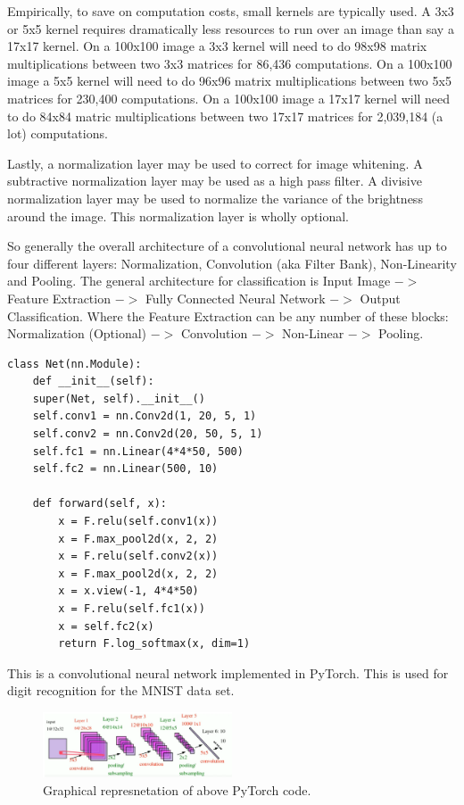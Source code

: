Empirically, to save on computation costs, small kernels are typically used.
A 3x3 or 5x5 kernel requires dramatically less resources to run over an image than say a 17x17 kernel.
On a 100x100 image a 3x3 kernel will need to do 98x98 matrix multiplications between two 3x3 matrices for 86,436 computations.
On a 100x100 image a 5x5 kernel will need to do 96x96 matrix multiplications between two 5x5 matrices for 230,400 computations.
On a 100x100 image a 17x17 kernel will need to do 84x84 matric multiplications between two 17x17 matrices for 2,039,184 (a lot) computations.

Lastly, a normalization layer may be used to correct for image whitening.
A subtractive normalization layer may be used as a high pass filter.
A divisive normalization layer may be used to normalize the variance of the brightness around the image.
This normalization layer is wholly optional.

So generally the overall architecture of a convolutional neural network has up to four different layers: Normalization, Convolution (aka Filter Bank), Non-Linearity and Pooling.
The general architecture for classification is Input Image $->$ Feature Extraction $->$ Fully Connected Neural Network $->$ Output Classification. 
Where the Feature Extraction can be any number of these blocks: Normalization (Optional) $->$ Convolution $->$ Non-Linear $->$ Pooling.

\begin{verbatim}
class Net(nn.Module):
    def __init__(self):
    super(Net, self).__init__()
    self.conv1 = nn.Conv2d(1, 20, 5, 1)
    self.conv2 = nn.Conv2d(20, 50, 5, 1)
    self.fc1 = nn.Linear(4*4*50, 500)
    self.fc2 = nn.Linear(500, 10)
    
    def forward(self, x):
        x = F.relu(self.conv1(x))
        x = F.max_pool2d(x, 2, 2)
        x = F.relu(self.conv2(x))
        x = F.max_pool2d(x, 2, 2)
        x = x.view(-1, 4*4*50)
        x = F.relu(self.fc1(x))
        x = self.fc2(x)
        return F.log_softmax(x, dim=1)
\end{verbatim}

This is a convolutional neural network implemented in PyTorch. This is used for
digit recognition for the MNIST data set. 

\begin{figure}[ht]
  \centering
      \includegraphics[width=0.5\textwidth]{lectures/03-b/images/PyTorchCNN.png}
          \caption{Graphical represnetation of above PyTorch code.}
\end{figure}

